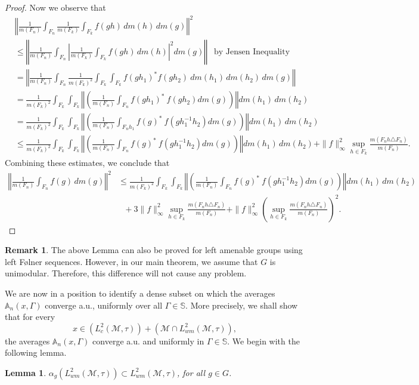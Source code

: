 \documentclass[11pt]{amsart}
\newtheorem{lem}[thm]{Lemma}
\theoremstyle{definition}
\theoremstyle{myremark}
\newtheorem{rem}[thm]{Remark}
\numberwithin{equation}{section}
\def\A{\mathbb A}
\def\S{\mathbb S}
\newcommand{\CM}{\mathcal{M}}
\newcommand{\abs}[1]{\left\vert#1\right\vert}
\newcommand{\norm}[1]{\left\Vert#1\right\Vert}
\begin{document}
\begin{proof}
\medskip
\noindent
Now we observe that 
\begin{align*}
&\norm{
\frac{1}{m(F_n)} \int_{F_n}
\frac{1}{m(F_k)} \int_{F_k} f(gh)\, dm(h)\, dm(g)
}^2\\
&\leq \norm{  \frac{1}{m(F_n)} \int_{F_n} \abs{
\frac{1}{m(F_k)} \int_{F_k} f(gh)\, dm(h)}^2 dm(g) } ~~\text{ by Jensen Inequality}\\
&= \norm{\frac{1}{m(F_n)} \int_{F_n}
\frac{1}{m(F_k)^2} \int_{F_k} \int_{F_k}
f( gh_1)^* f( gh_2) ~ dm(h_1)\, dm(h_2)\, dm(g) } \\
&= \frac{1}{m(F_k)^2} \int_{F_k} \int_{F_k}
\norm{ \left( \frac{1}{m(F_n)} \int_{F_n}
f( gh_1)^* ~ f( gh_2) dm(g) \right) }
dm(h_1)\, dm(h_2)\\
&= \frac{1}{m(F_k)^2} \int_{F_k} \int_{F_k}
\norm{ \left( \frac{1}{m(F_n)} \int_{F_nh_1}
f( g)^* ~ f( gh_{1}^{-1}h_2) dm(g) \right) }
dm(h_1)\, dm(h_2)\\
&\leq  \frac{1}{m(F_k)^2} \int_{F_k} \int_{F_k}
\norm{ \left( \frac{1}{m(F_n)} \int_{F_n}
f( g)^* ~ f(gh_{1}^{-1}h_2) dm(g) \right) }
dm(h_1)\, dm(h_2) + \|f\|_\infty^2 \sup_{h \in F_k}
\frac{m(F_nh \triangle F_n)}{m(F_n)}.
\end{align*}
Combining these estimates,  we conclude that
\begin{align*}
\norm{
\frac{1}{m(F_n)} \int_{F_n} f(g)\, dm(g)
}^2 &\leq 
\frac{1}{m(F_k)^2} \int_{F_k} \int_{F_k}
\norm{ \left( \frac{1}{m(F_n)} \int_{F_n}
f( g)^* ~ f( gh_{1}^{-1}h_2) dm(g) \right) }
dm(h_1)\, dm(h_2) \\
&~~~+ 3\|f\|_\infty^2 \sup_{h \in F_k}
\frac{m(F_nh \triangle F_n)}{m(F_n)}  +   \|f\|^2_\infty \left( \sup_{h \in F_k}
\frac{m(F_nh \triangle F_n)}{m(F_n)} \right)^2.
\end{align*}

\end{proof}
\begin{rem}
    The above Lemma can also be proved for left amenable groups using left F\o lner sequences. However, in our main theorem, we assume that $G$ is unimodular. Therefore, this difference will not cause any problem.
\end{rem}
\noindent We are now in a position to identify a dense subset on which the averages  $ \A_n(x,\Gamma)$
converge a.u., uniformly over all $\Gamma \in \S$. More precisely, we shall show that for every
\[
x \in ( L_c^2(\CM,\tau)) + (\CM \cap L_{wm}^2(\CM,\tau)),
\]
the averages $ \A_n(x,\Gamma)$
converge a.u. and uniformly in $\Gamma \in \S$. We begin with the following lemma.
\begin{lem}
$\alpha_g(L^{2}_{wm}(\CM,\tau)) \subset L^{2}_{wm}(\CM,\tau)$, for all $  g\in G $.
\end{lem}
\end{document}
